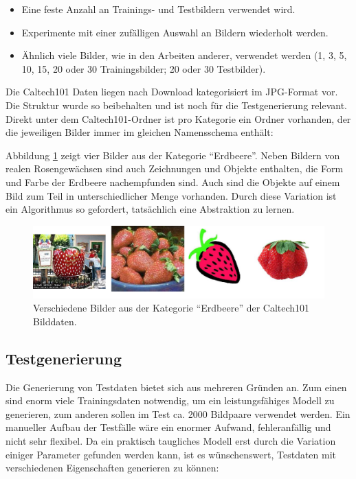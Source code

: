 \begin{itemize}
	\item Eine feste Anzahl an Trainings- und Testbildern verwendet wird.
	\item Experimente mit einer zufälligen Auswahl an Bildern wiederholt werden.
	\item Ähnlich viele Bilder, wie in den Arbeiten anderer, verwendet werden (1, 3, 5, 10, 15, 20 oder 30 Trainingsbilder; 20 oder 30 Testbilder).
\end{itemize}

Die Caltech101 Daten liegen nach Download kategorisiert im JPG-Format vor. Die Struktur wurde so beibehalten und ist noch für die Testgenerierung relevant. Direkt unter dem Caltech101-Ordner ist pro Kategorie ein Ordner vorhanden, der die jeweiligen Bilder immer im gleichen Namensschema enthält:\newline


Abbildung \ref{img:strawberries} zeigt vier Bilder aus der Kategorie \enquote{Erdbeere}. Neben Bildern von realen Rosengewächsen sind auch Zeichnungen und Objekte enthalten, die Form und Farbe der Erdbeere nachempfunden sind. Auch sind die Objekte auf einem Bild zum Teil in unterschiedlicher Menge vorhanden. Durch diese Variation ist ein Algorithmus so gefordert, tatsächlich eine Abstraktion zu lernen.

\begin{figure}
	\centering
	\includegraphics[scale=0.5]{images/strawberry.png}
	\caption{Verschiedene Bilder aus der Kategorie \enquote{Erdbeere} der Caltech101 Bilddaten.}
	\label{img:strawberries}
\end{figure}

\subsection{Testgenerierung}

Die Generierung von Testdaten bietet sich aus mehreren Gründen an. Zum einen sind enorm viele Trainingsdaten notwendig, um ein leistungsfähiges Modell zu generieren, zum anderen sollen im Test ca. 2000 Bildpaare verwendet werden. Ein manueller Aufbau der Testfälle wäre ein enormer Aufwand, fehleranfällig und nicht sehr flexibel. Da ein praktisch taugliches Modell erst durch die Variation einiger Parameter gefunden werden kann, ist es wünschenswert, Testdaten mit verschiedenen Eigenschaften generieren zu können:

